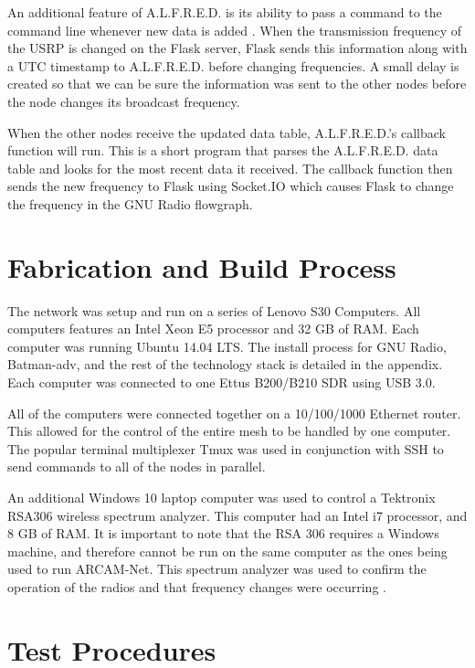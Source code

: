  An additional feature of A.L.F.R.E.D. is its ability to pass a command to the command line whenever new data is added \cite{0015}. When the transmission frequency of the USRP is changed on the Flask server, Flask sends this information along with a UTC timestamp to A.L.F.R.E.D. before changing frequencies. A small delay is created so that we can be sure the information was sent to the other nodes before the node changes its broadcast frequency.  

 When the other nodes receive the updated data table, A.L.F.R.E.D.'s callback function will run. This is a short program that parses the A.L.F.R.E.D. data table and looks for the most recent data it received. The callback function then sends the new frequency to Flask using Socket.IO which causes Flask to change the frequency in the GNU Radio flowgraph.   

\section{Fabrication and Build Process}

The network was setup and run on a series of Lenovo S30 Computers. All computers features an Intel Xeon E5 processor and 32 GB of RAM. Each computer was running Ubuntu 14.04 LTS. The install process for GNU Radio, Batman-adv, and the rest of the technology stack is detailed in the appendix. Each computer was connected to one Ettus B200/B210 SDR using USB 3.0. 

All of the computers were connected together on a 10/100/1000 Ethernet router. This allowed for the control of the entire mesh to be handled by one computer. The popular terminal multiplexer Tmux was used in conjunction with SSH to send commands to all of the nodes in parallel. 

An additional Windows 10 laptop computer was used to control a Tektronix RSA306 wireless spectrum analyzer. This computer had an Intel i7 processor, and 8 GB of RAM. It is important to note that the RSA 306 requires a Windows machine, and therefore cannot be run on the same computer as the ones being used to run ARCAM-Net. This spectrum analyzer was used to confirm the operation of the radios and that frequency changes were occurring \cite{specan1}. 


\section{Test Procedures}

